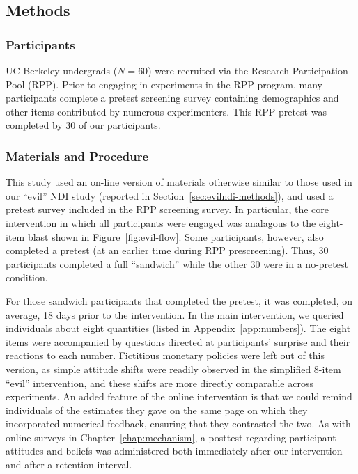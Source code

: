 \subsection{Methods}

\subsubsection{Participants}

UC Berkeley undergrads ($N=60$) were recruited via the Research Participation
Pool (RPP). Prior to engaging in experiments in the RPP program, many
participants complete a pretest screening survey containing demographics and
other items contributed by numerous experimenters. This RPP pretest was
completed by 30 of our participants. 

\subsubsection{Materials and Procedure}

This study used an on-line version of materials otherwise similar to those used
in our “evil” NDI study (reported in Section~\ref{sec:evilndi-methods}), and
used a pretest survey included in the RPP screening survey. In particular, the
core intervention in which all participants were engaged was analagous to the
eight-item blast shown in Figure~\ref{fig:evil-flow}. Some participants,
however, also completed a pretest (at an earlier time during RPP prescreening).
Thus, 30 participants completed a full “sandwich” while the other 30 were in a
no-pretest condition. 

For those sandwich participants that completed the pretest, it was completed, on
average, 18 days prior to the intervention. In the main intervention, we queried
individuals about eight quantities (listed in Appendix~\ref{app:numbers}). The
eight items were accompanied by questions directed at participants’ surprise and
their reactions to each number.  Fictitious monetary policies were left out of
this version, as simple attitude shifts were readily observed in the simplified
8-item “evil” intervention, and these shifts are more directly comparable across
experiments.  An added feature of the online intervention is that we could
remind individuals of the estimates they gave on the same page on which they
incorporated numerical feedback, ensuring that they contrasted the two. As with
online surveys in Chapter~\ref{chap:mechanism}, a posttest regarding participant
attitudes and beliefs was administered both immediately after our intervention and
after a retention interval.


